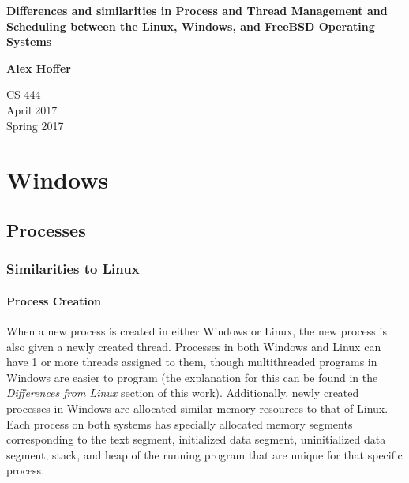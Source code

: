 \documentclass[letterpaper,10pt,titlepage]{article}
\begin{document}
\begin{titlepage}
    \begin{center}
        \vspace*{3.5cm}

        \textbf{Differences and similarities in Process and Thread Management and Scheduling between the Linux, Windows, and FreeBSD Operating Systems}

        \vspace{0.5cm}

        \textbf{Alex Hoffer}

        \vspace{0.8cm}

        CS 444\\
        April 2017\\
	Spring 2017\\

        \vfill

    \end{center}
\end{titlepage}

\newpage

\tableofcontents

\newpage



\section{Windows}
\subsection{Processes}

\subsubsection{Similarities to Linux}
\paragraph{Process Creation}
When a new process is created in either Windows or Linux, the new process is also given a newly created thread. Processes in both Windows and Linux can have 1 or more threads assigned to them, though multithreaded programs in Windows are easier to program (the explanation for this can be found in the \emph{Differences from Linux} section of this work). Additionally, newly created processes in Windows are allocated similar memory resources to that of Linux. Each process on both systems has specially allocated memory segments corresponding to the text segment, initialized data segment, uninitialized data segment, stack, and heap of the running program that are unique for that specific process.
\end{document}
